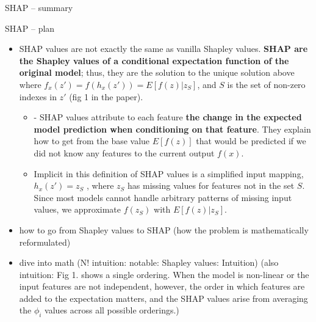 \documentclass[aspectratio=169,handout]{beamer} %
\newcommand{\AW}[1]{\todo[inline, backgroundcolor=teal!20, author=AW]{#1}}
\begin{document}
% 


\begin{frame}{SHAP -- summary}
    \AW{???}
\end{frame}

\begin{frame}{SHAP -- plan}
\begin{itemize}
    \item SHAP values are not exactly the same as vanilla Shapley values. \textbf{SHAP are the Shapley values of a conditional expectation function of the original model}; thus, they are the solution to the unique solution above where $f_x(z') = f(h_x(z')) = E[f (z) | z_S ]$, and $S$ is the set of non-zero indexes in $z'$ (fig 1 in the paper).
    \begin{itemize}
    \tiny
        \item - SHAP values attribute to each feature \textbf{the change in the expected model prediction when conditioning on that feature}. They explain how to get from the base value $E[f (z)]$ that would be predicted if we did not know any features to the current output $f(x)$.
        \item Implicit in this definition of SHAP values is a simplified input mapping, $h_x(z') = z_S$ , where $z_S$ has missing values for features not in the set $S$. Since most models cannot handle arbitrary patterns of missing input values, we approximate $f (z_S )$ with $E[f (z) | z_S ]$.
    \end{itemize}
    \item how to go from Shapley values to SHAP (how the problem is mathematically reformulated)
    \item dive into math (N! intuition: notable: Shapley values: Intuition) (also intuition: Fig 1. shows a single ordering. When the model is non-linear or the input features are not independent, however, the order in which features are added to the expectation matters, and the SHAP values arise from averaging the $\phi_i$ values across all possible orderings.)
\end{itemize}
\end{frame}
\end{document}
